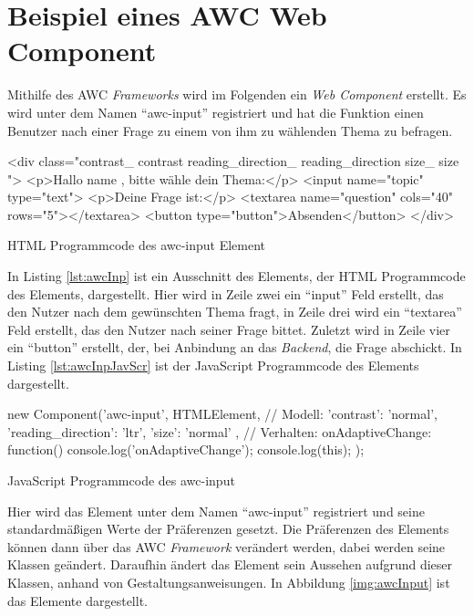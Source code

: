 \documentclass[12pt, paper=a4, bibtotoc, toc=listof, headsepline=true, numbers=endperiod]{scrreprt}
\begin{document}
\section{Beispiel eines AWC Web Component}
	Mithilfe des AWC \emph{Frameworks} wird im Folgenden ein \emph{Web Component} erstellt. Es wird unter dem Namen \enquote{awc-input} registriert und hat die Funktion einen Benutzer nach einer Frage zu einem von ihm zu wählenden Thema zu befragen.
	\begin{listing}
	\begin{HTMLcode*}{}
<div class="contrast_{{ contrast }} reading_direction_{{ reading_direction }} size_{{ size }}">
	<p>Hallo{{ name }}, bitte wähle dein Thema:</p>  <input name="topic" type="text">
	<p>Deine Frage ist:</p> <textarea name="question" cols="40" rows="5"></textarea>
	<button type="button">Absenden</button>
</div>
	\end{HTMLcode*}
	\caption[Das awc-input Element]{HTML Programmcode des awc-input Element}
	\label{lst:awcInp}
\end{listing}\noindent
	In Listing \ref{lst:awcInp} ist ein Ausschnitt des Elements, der HTML Programmcode des Elements, dargestellt. Hier wird in Zeile zwei ein \enquote{input} Feld erstellt, das den Nutzer nach dem gewünschten Thema fragt, in Zeile drei wird ein \enquote{textarea} Feld erstellt, das den Nutzer nach seiner Frage bittet. Zuletzt wird in Zeile vier ein \enquote{button} erstellt, der, bei Anbindung an das \emph{Backend}, die Frage abschickt. In Listing \ref{lst:awcInpJavScr} ist der JavaScript Programmcode des Elements dargestellt.
	\begin{listing}
		\begin{JavaScriptcode*}{}
new Component('awc-input', HTMLElement,
	// Modell:
	{
		'contrast': 'normal',
		'reading_direction': 'ltr',
		'size': 'normal'
	},
	// Verhalten:
	{
		onAdaptiveChange: function() {
			console.log('onAdaptiveChange');
			console.log(this);
		}
	});
		\end{JavaScriptcode*}
		\caption[JavaScript Programmcode awc-input]{JavaScript Programmcode des awc-input}
		\label{lst:awcInpJavScr}
	\end{listing}\noindent
	Hier wird das Element unter dem Namen \enquote{awc-input} registriert und seine standardmäßigen Werte der Präferenzen gesetzt. Die Präferenzen des Elements können dann über das AWC \emph{Framework} verändert werden, dabei werden seine Klassen geändert. Daraufhin ändert das Element sein Aussehen aufgrund dieser Klassen, anhand von Gestaltungsanweisungen. In Abbildung \ref{img:awcInput} ist das Elemente dargestellt.
\end{document}
